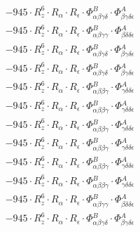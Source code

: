\documentclass{article}
\begin{document}
\begin{subequations}
\begin{gather}
\begin{array}{c}
 \\[0.2em] 		 - 945 \cdot R_{z}^{6} \cdot R_{\alpha{}} \cdot R_{\epsilon{}} \cdot \Phi{}^{B}_{\alpha{}\beta{}\gamma{}\delta{}} \cdot \Phi{}^{A}_{\beta{}\gamma{}\delta{}\epsilon{}} 
 \\[0.2em] 		 - 945 \cdot R_{z}^{6} \cdot R_{\alpha{}} \cdot R_{\epsilon{}} \cdot \Phi{}^{B}_{\alpha{}\beta{}\gamma{}\gamma{}} \cdot \Phi{}^{A}_{\beta{}\delta{}\delta{}\epsilon{}} 
 \\[0.2em] 		 - 945 \cdot R_{z}^{6} \cdot R_{\alpha{}} \cdot R_{\epsilon{}} \cdot \Phi{}^{B}_{\alpha{}\beta{}\gamma{}\delta{}} \cdot \Phi{}^{A}_{\beta{}\gamma{}\delta{}\epsilon{}} 
 \\[0.2em] 		 - 945 \cdot R_{z}^{6} \cdot R_{\alpha{}} \cdot R_{\epsilon{}} \cdot \Phi{}^{B}_{\alpha{}\beta{}\gamma{}\delta{}} \cdot \Phi{}^{A}_{\beta{}\gamma{}\delta{}\epsilon{}} 
 \\[0.2em] 		 - 945 \cdot R_{z}^{6} \cdot R_{\alpha{}} \cdot R_{\epsilon{}} \cdot \Phi{}^{B}_{\alpha{}\beta{}\beta{}\gamma{}} \cdot \Phi{}^{A}_{\gamma{}\delta{}\delta{}\epsilon{}} 
 \\[0.2em] 		 - 945 \cdot R_{z}^{6} \cdot R_{\alpha{}} \cdot R_{\epsilon{}} \cdot \Phi{}^{B}_{\alpha{}\beta{}\beta{}\gamma{}} \cdot \Phi{}^{A}_{\gamma{}\delta{}\delta{}\epsilon{}} 
 \\[0.2em] 		 - 945 \cdot R_{z}^{6} \cdot R_{\alpha{}} \cdot R_{\epsilon{}} \cdot \Phi{}^{B}_{\alpha{}\beta{}\beta{}\gamma{}} \cdot \Phi{}^{A}_{\gamma{}\delta{}\delta{}\epsilon{}} 
 \\[0.2em] 		 - 945 \cdot R_{z}^{6} \cdot R_{\alpha{}} \cdot R_{\epsilon{}} \cdot \Phi{}^{B}_{\alpha{}\beta{}\beta{}\gamma{}} \cdot \Phi{}^{A}_{\gamma{}\delta{}\delta{}\epsilon{}} 
 \\[0.2em] 		 - 945 \cdot R_{z}^{6} \cdot R_{\alpha{}} \cdot R_{\epsilon{}} \cdot \Phi{}^{B}_{\alpha{}\beta{}\beta{}\gamma{}} \cdot \Phi{}^{A}_{\gamma{}\delta{}\delta{}\epsilon{}} 
 \\[0.2em] 		 - 945 \cdot R_{z}^{6} \cdot R_{\alpha{}} \cdot R_{\epsilon{}} \cdot \Phi{}^{B}_{\alpha{}\beta{}\beta{}\gamma{}} \cdot \Phi{}^{A}_{\gamma{}\delta{}\delta{}\epsilon{}} 
 \\[0.2em] 		 - 945 \cdot R_{z}^{6} \cdot R_{\alpha{}} \cdot R_{\epsilon{}} \cdot \Phi{}^{B}_{\alpha{}\beta{}\gamma{}\gamma{}} \cdot \Phi{}^{A}_{\beta{}\delta{}\delta{}\epsilon{}} 
 \\[0.2em] 		 - 945 \cdot R_{z}^{6} \cdot R_{\alpha{}} \cdot R_{\epsilon{}} \cdot \Phi{}^{B}_{\alpha{}\beta{}\gamma{}\delta{}} \cdot \Phi{}^{A}_{\beta{}\gamma{}\delta{}\epsilon{}} 

\end{array}
\end{gather}
\end{subequations}
\end{document}
